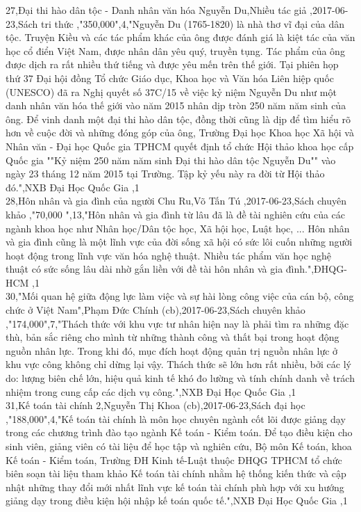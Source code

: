 \documentclass[a4paper]{article}
\begin{document}
27,Đại thi hào dân tộc - Danh nhân văn hóa Nguyễn Du,Nhiều tác giả ,2017-06-23,Sách tri thức ,"350,000",4,"Nguyễn Du (1765-1820) là nhà thơ vĩ đại của dân tộc. Truyện Kiều và các tác phẩm khác của ông được đánh giá là kiệt tác của văn học cổ điển Việt Nam, được nhân dân yêu quý, truyền tụng. Tác phẩm của ông được dịch ra rất nhiều thứ tiếng và được yêu mến trên thế giới. Tại phiên họp thứ 37 Đại hội đồng Tổ chức Giáo dục, Khoa học và Văn hóa Liên hiệp quốc (UNESCO) đã ra Nghị quyết số 37C/15 về việc kỷ niệm Nguyễn Du như một danh nhân văn hóa thế giới vào năm 2015 nhân dịp tròn 250 năm năm sinh của ông. Để vinh danh một đại thi hào dân tộc, đồng thời cũng là dịp để tìm hiểu rõ hơn về cuộc đời và những đóng góp của ông, Trường Đại học Khoa học Xã hội và Nhân văn - Đại học Quốc gia TPHCM quyết định tổ chức Hội thảo khoa học cấp Quốc gia ""Kỷ niệm 250 năm năm sinh Đại thi hào dân tộc Nguyễn Du"" vào ngày 23 tháng 12 năm 2015 tại Trường. Tập kỷ yếu này ra đời từ Hội thảo đó.",NXB Đại Học Quốc Gia ,1\\
28,Hôn nhân và gia đình của người Chu Ru,Võ Tấn Tú ,2017-06-23,Sách chuyên khảo ,"70,000 ",13,"Hôn nhân và gia đình từ lâu đã là đề tài nghiên cứu của các ngành khoa học như Nhân học/Dân tộc học, Xã hội học, Luật học, ... Hôn nhân và gia đình cũng là một lĩnh vực của đời sống xã hội có sức lôi cuốn những người hoạt động trong lĩnh vực văn hóa nghệ thuật. Nhiều tác phẩm văn học nghệ thuật có sức sống lâu dài nhờ gắn liền với đề tài hôn nhân và gia đình.",ĐHQG-HCM ,1\\
30,"Mối quan hệ giữa động lực làm việc và sự hài lòng công việc của cán bộ, công chức ở Việt Nam",Phạm Đức Chính (cb),2017-06-23,Sách chuyên khảo ,"174,000",7,"Thách thức với khu vực tư nhân hiện nay là phải tìm ra những đặc thù, bản sắc riêng cho mình từ những thành công và thất bại trong hoạt động nguồn nhân lực. Trong khi đó, mục đích hoạt động quản trị nguồn nhân lực ở khu vực công không chỉ dừng lại vậy. Thách thức sẽ lớn hơn rất nhiều, bởi các lý do: lượng biên chế lớn, hiệu quả kinh tế khó đo lường và tính chính danh về trách nhiệm trong cung cấp các dịch vụ công.",NXB Đại Học Quốc Gia ,1\\
31,Kế toán tài chính 2,Nguyễn Thị Khoa (cb),2017-06-23,Sách đại học ,"188,000",4,"Kế toán tài chính là môn học chuyên ngành cốt lõi được giảng dạy trong các chương trình đào tạo ngành Kế toán - Kiểm toán. Để tạo điều kiện cho sinh viên, giảng viên có tài liệu để học tập và nghiên cứu, Bộ môn Kế toán, khoa Kế toán - Kiểm toán, Trường ĐH Kinh tế-Luật thuộc ĐHQG TPHCM tổ chức biên soạn tài liệu tham khảo Kế toán tài chính nhằm hệ thống kiến thức và cập nhật những thay đổi mới nhất lĩnh vực kế toán tài chính phù hợp với xu hướng giảng dạy trong điều kiện hội nhập kế toán quốc tế.",NXB Đại Học Quốc Gia ,1\\
\end{document}
